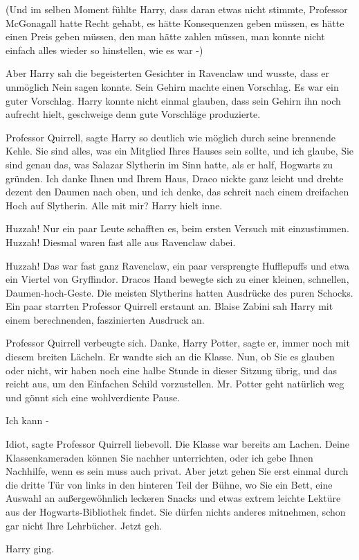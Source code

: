 (Und im selben Moment fühlte Harry, dass daran etwas nicht stimmte, Professor
McGonagall hatte Recht gehabt, es hätte Konsequenzen geben müssen, es hätte
einen Preis geben müssen, den man hätte zahlen müssen, man konnte nicht einfach
alles wieder so hinstellen, wie es war -)

Aber Harry sah die begeisterten Gesichter in Ravenclaw und wusste, dass er
unmöglich Nein sagen konnte. Sein Gehirn machte einen Vorschlag. Es war ein
guter Vorschlag. Harry konnte nicht einmal glauben, dass sein Gehirn ihn noch
aufrecht hielt, geschweige denn gute Vorschläge produzierte.

\glqq Professor Quirrell\grqq{}, sagte Harry so deutlich wie möglich durch seine
brennende Kehle. \glqq Sie sind alles, was ein Mitglied Ihres Hauses sein
sollte, und ich glaube, Sie sind genau das, was Salazar Slytherin im Sinn hatte,
als er half, Hogwarts zu gründen. Ich danke Ihnen und Ihrem Haus\grqq{}, Draco
nickte ganz leicht und drehte dezent den Daumen nach oben, \glqq und ich denke,
das schreit nach einem dreifachen Hoch auf Slytherin. Alle mit mir?\grqq{} Harry
hielt inne.

\glqq Huzzah!\grqq{} Nur ein paar Leute schafften es, beim ersten Versuch mit
einzustimmen. \glqq Huzzah!\grqq{} Diesmal waren fast alle aus Ravenclaw dabei.

\glqq Huzzah!\grqq{} Das war fast ganz Ravenclaw, ein paar versprengte
Hufflepuffs und etwa ein Viertel von Gryffindor. Dracos Hand bewegte sich zu
einer kleinen, schnellen, Daumen-hoch-Geste. Die meisten Slytherins hatten
Ausdrücke des puren Schocks. Ein paar starrten Professor Quirrell erstaunt an.
Blaise Zabini sah Harry mit einem berechnenden, faszinierten Ausdruck an.

Professor Quirrell verbeugte sich. \glqq Danke, Harry Potter\grqq{}, sagte er,
immer noch mit diesem breiten Lächeln. Er wandte sich an die Klasse. \glqq Nun,
ob Sie es glauben oder nicht, wir haben noch eine halbe Stunde in dieser Sitzung
übrig, und das reicht aus, um den Einfachen Schild vorzustellen. Mr. Potter geht
natürlich weg und gönnt sich eine wohlverdiente Pause.\grqq{}

\glqq Ich kann -\grqq{}

\glqq Idiot\grqq{}, sagte Professor Quirrell liebevoll. Die Klasse war bereits
am Lachen. \glqq Deine Klassenkameraden können Sie nachher unterrichten, oder
ich gebe Ihnen Nachhilfe, wenn es sein muss auch privat. Aber jetzt gehen Sie
erst einmal durch die dritte Tür von links in den hinteren Teil der Bühne, wo
Sie ein Bett, eine Auswahl an außergewöhnlich leckeren Snacks und etwas extrem
leichte Lektüre aus der Hogwarts-Bibliothek findet. Sie dürfen nichts anderes
mitnehmen, schon gar nicht Ihre Lehrbücher. Jetzt geh.\grqq{}

Harry ging.
